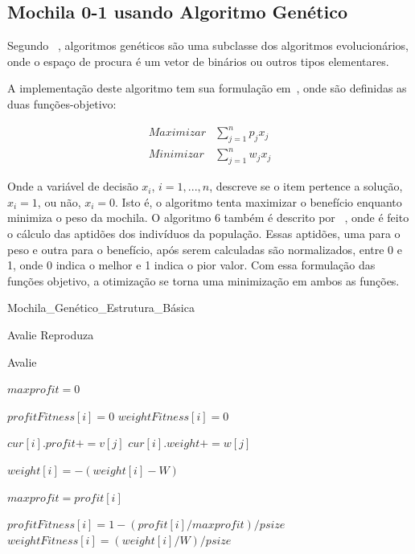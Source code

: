 \newpage

\subsection{Mochila 0-1 usando Algoritmo Genético} \label{cap4:gen}

Segundo ~\cite{Wei09}, algoritmos genéticos são uma subclasse dos algoritmos evolucionários, onde o espaço de procura é um vetor de binários ou outros tipos elementares.

A implementação deste algoritmo tem sua formulação em~\cite{KJBR08}, onde são definidas as duas funções-objetivo:

\begin{eqnarray}
	Maximizar & \displaystyle \sum_{j = 1}^{n}p_{j}x_{j} \\
	Minimizar & \displaystyle \sum_{j = 1}^{n}w_{j}x_{j}
\end{eqnarray}

Onde a variável de decisão $x_{i}$, $i = 1, ..., n$, descreve se o item pertence a solução, $x_{i} = 1$, ou não, $x_{i} = 0$. Isto é, o algoritmo tenta maximizar o benefício enquanto minimiza o peso da mochila. O algoritmo 6 também é descrito por ~\cite{KJBR08}, onde é feito o cálculo das aptidões dos indivíduos da população. Essas aptidões, uma para o peso e outra para o benefício, após serem calculadas são normalizados, entre 0 e 1, onde 0 indica o melhor e 1 indica o pior valor. Com essa formulação das funções objetivo, a otimização se torna uma minimização em ambos as funções.

\begin{algorithm}[htp]
\caption{Mochila\_Genético\_Estrutura\_Básica} %
\label{alg5}
\scriptsize
\begin{algorithmic}[1]

		\STATE Avalie
		\STATE Reproduza
	\ENDFOR

\end{algorithmic}
\end{algorithm}

\begin{algorithm}
\caption{Avalie} %
\scriptsize
\label{alg6}
\begin{algorithmic}[1]

  \STATE $maxprofit = 0$

    \STATE $profitFitness[i] = 0$
    \STATE $weightFitness[i] = 0$

		\STATE $cur[i].profit += v[j]$ %
		\STATE $cur[i].weight += w[j]$

      \STATE $weight[i] = -(weight[i] - W)$
		\ENDIF

      \STATE $maxprofit = profit[i]$
		\ENDIF
  \ENDFOR

    \STATE $profitFitness[i] = 1 - (profit[i] / maxprofit) / psize$
    \STATE $weightFitness[i] = (weight[i] / W) / psize$
  \ENDFOR

\end{algorithmic}
\end{algorithm}

